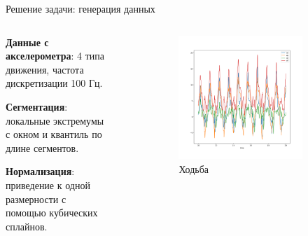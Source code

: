 \documentclass{beamer}
\begin{document}
    \begin{frame}{Решение задачи: генерация данных}
    \begin{columns} %
        \begin{column}{.4\textwidth}
            \textbf{Данные с акселерометра}: 4 типа движения, частота дискретизации
            100 Гц.

            \textbf{Сегментация}: локальные экстремумы с окном и квантиль по длине
            сегментов.

            \textbf{Нормализация}: приведение к одной размерности с помощью
            кубических сплайнов.

        \end{column}%
        \hfill
        \begin{column}{.6\textwidth}
            \begin{figure}
                \begin{subfigure}[b]{0.48\textwidth}
                    \centering
                    \includegraphics[width=\linewidth]{../pics/raw_walking.png}
                    \caption{Ходьба}
                \end{subfigure}
                \begin{subfigure}[b]{0.48\textwidth}
                    \centering

\end{subfigure}
\end{figure}
\end{column}
\end{columns}
\end{frame}
\end{document}
